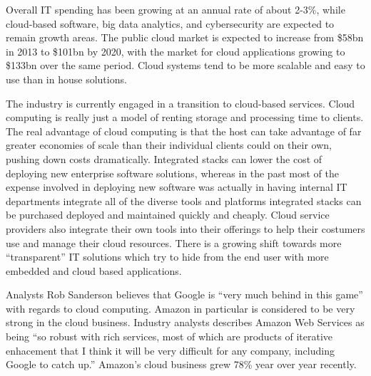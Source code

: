Overall IT spending has been growing at an annual rate of about 2-3\%, while cloud-based software, big data analytics, and cybersecurity are expected to remain growth areas.\autocite[]{CloudAnalyticsCybersecurityApplication}\autocite[]{CIOIntro}
The public cloud market is expected to increase from \$58bn in 2013 to \$101bn by 2020, with the market for cloud applications growing to \$133bn over the same period.\autocite[]{CIOIntro}
Cloud systems tend to be more scalable and easy to use than in house solutions.\autocite[]{CIOIntro}

The industry is currently engaged in a transition to cloud-based services.\autocite[39]{SurveysSoftware2015}
Cloud computing is really just a model of renting storage and processing time to clients.\autocite[]{AftermathOfIntegratedStack}
The real advantage of cloud computing is that the host can take advantage of far greater economies of scale than their individual clients could on their own, pushing down costs dramatically.\autocite[]{AftermathOfIntegratedStack}
Integrated stacks can lower the cost of deploying new enterprise software solutions, whereas in the past most of the expense involved in deploying new software was actually in having internal IT departments integrate all of the diverse tools and platforms integrated stacks can be purchased deployed and maintained quickly and cheaply.\autocite[]{AftermathOfIntegratedStack}
Cloud service providers also integrate their own tools into their offerings to help their costumers use and manage their cloud resources.\autocite[]{AftermathOfIntegratedStack}
There is a growing shift towards more ``transparent'' IT solutions which try to hide from the end user with more embedded and cloud based applications.\autocite[]{OptimismInnovation}

Analysts Rob Sanderson believes that Google is ``very much behind in this game'' with regards to cloud computing.\autocite[]{GoogleCloudBoost}
Amazon in particular is considered to be very strong in the cloud business.  Industry analysts describes Amazon Web Services as being ``so robust with rich services, most of which are products of iterative enhacement that I think it will be very difficult for any company, including Google to catch up.''\autocite[]{GoogleCloudBoost}
Amazon's cloud business grew 78\% year over year recently.\autocite[]{GoogleCloudBoost}

